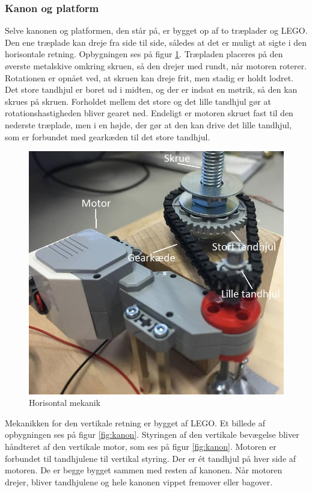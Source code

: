 \subsubsection{Kanon og platform}
Selve kanonen og platformen, den står på, er bygget op af to træplader og LEGO. Den ene træplade kan dreje fra side til side, således at det er muligt at sigte i den horisontale retning. Opbygningen ses på figur \ref{fig:Horisontalmekanik}. Træpladen placeres på den øverste metalskive omkring skruen, så den drejer med rundt, når motoren roterer. Rotationen er opnået ved, at skruen kan dreje frit, men stadig er holdt lodret. Det store tandhjul er boret ud i midten, og der er indsat en møtrik, så den kan skrues på skruen. Forholdet mellem det store og det lille tandhjul gør at rotationshastigheden bliver gearet ned. Endeligt er motoren skruet fast til den nederste træplade, men i en højde, der gør at den kan drive det lille tandhjul, som er forbundet med gearkæden til det store tandhjul. 

\begin{figure}[H]
	\centering
	\includegraphics[width=1\textwidth]{Afsnit/DesignOgImplementering/images/horisontalMekanik}
	\caption{Horisontal mekanik}
	\label{fig:Horisontalmekanik}
\end{figure}

Mekanikken for den vertikale retning er bygget af LEGO. Et billede af opbygningen ses på figur \ref{fig:kanon}. Styringen af den vertikale bevægelse bliver håndteret af den vertikale motor, som ses på figur \ref{fig:kanon}. Motoren er forbundet til tandhjulene til vertikal styring. Der er ét tandhjul på hver side af motoren. De er begge bygget sammen med resten af kanonen. Når motoren drejer, bliver tandhjulene og hele kanonen vippet fremover eller bagover. 

